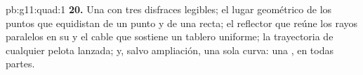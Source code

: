 \begin{solution}{pb:g11:quad:1}
\textbf{20.} Una  con tres disfraces legibles; el lugar geométrico
de los puntos que equidistan de un punto y de una recta; el reflector que
reúne los rayos paralelos en su  y el cable que sostiene un tablero
uniforme; la trayectoria de cualquier pelota lanzada; y, salvo ampliación,
una sola curva: una , en todas partes.
\end{solution}
